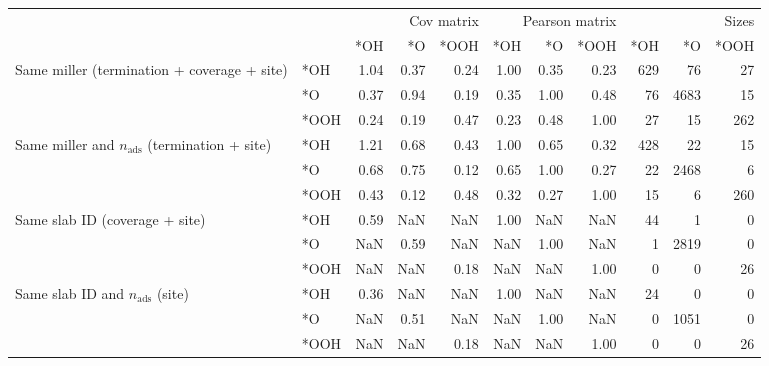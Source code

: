 \begin{tabular}{llrrrrrrrrr}
\toprule
 &  & \multicolumn{3}{r}{Cov matrix} & \multicolumn{3}{r}{Pearson matrix} & \multicolumn{3}{r}{Sizes} \\
 &  & *OH & *O & *OOH & *OH & *O & *OOH & *OH & *O & *OOH \\
\midrule
\multirow[t]{3}{*}{Same miller (termination + coverage + site)} & *OH & 1.04 & 0.37 & 0.24 & 1.00 & 0.35 & 0.23 & 629 & 76 & 27 \\
 & *O & 0.37 & 0.94 & 0.19 & 0.35 & 1.00 & 0.48 & 76 & 4683 & 15 \\
 & *OOH & 0.24 & 0.19 & 0.47 & 0.23 & 0.48 & 1.00 & 27 & 15 & 262 \\
\cline{1-11}
\multirow[t]{3}{*}{Same miller and $n_\text{ads}$ (termination + site)} & *OH & 1.21 & 0.68 & 0.43 & 1.00 & 0.65 & 0.32 & 428 & 22 & 15 \\
 & *O & 0.68 & 0.75 & 0.12 & 0.65 & 1.00 & 0.27 & 22 & 2468 & 6 \\
 & *OOH & 0.43 & 0.12 & 0.48 & 0.32 & 0.27 & 1.00 & 15 & 6 & 260 \\
\cline{1-11}
\multirow[t]{3}{*}{Same slab ID (coverage + site)} & *OH & 0.59 & NaN & NaN & 1.00 & NaN & NaN & 44 & 1 & 0 \\
 & *O & NaN & 0.59 & NaN & NaN & 1.00 & NaN & 1 & 2819 & 0 \\
 & *OOH & NaN & NaN & 0.18 & NaN & NaN & 1.00 & 0 & 0 & 26 \\
\cline{1-11}
\multirow[t]{3}{*}{Same slab ID and $n_\text{ads}$ (site)} & *OH & 0.36 & NaN & NaN & 1.00 & NaN & NaN & 24 & 0 & 0 \\
 & *O & NaN & 0.51 & NaN & NaN & 1.00 & NaN & 0 & 1051 & 0 \\
 & *OOH & NaN & NaN & 0.18 & NaN & NaN & 1.00 & 0 & 0 & 26 \\
\cline{1-11}
\bottomrule
\end{tabular}
